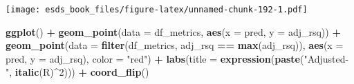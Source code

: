 \documentclass[
]{book}
\newenvironment{Shaded}{\begin{snugshade}}{\end{snugshade}}
\newcommand{\DataTypeTok}[1]{\textcolor[rgb]{0.13,0.29,0.53}{#1}}
\newcommand{\DecValTok}[1]{\textcolor[rgb]{0.00,0.00,0.81}{#1}}
\newcommand{\KeywordTok}[1]{\textcolor[rgb]{0.13,0.29,0.53}{\textbf{#1}}}
\newcommand{\NormalTok}[1]{#1}
\newcommand{\OperatorTok}[1]{\textcolor[rgb]{0.81,0.36,0.00}{\textbf{#1}}}
\newcommand{\StringTok}[1]{\textcolor[rgb]{0.31,0.60,0.02}{#1}}
\begin{document}
\begin{Shaded}
\end{Shaded}

\texttt{[image: esds\_book\_files/figure-latex/unnamed-chunk-192-1.pdf]}

\begin{Shaded}
\begin{Highlighting}[]
\KeywordTok{ggplot}\NormalTok{() }\OperatorTok{+}
\StringTok{  }\KeywordTok{geom_point}\NormalTok{(}\DataTypeTok{data =}\NormalTok{ df_metrics, }\KeywordTok{aes}\NormalTok{(}\DataTypeTok{x =}\NormalTok{ pred, }\DataTypeTok{y =}\NormalTok{ adj_rsq)) }\OperatorTok{+}
\StringTok{  }\KeywordTok{geom_point}\NormalTok{(}\DataTypeTok{data =} \KeywordTok{filter}\NormalTok{(df_metrics, adj_rsq }\OperatorTok{==}\StringTok{ }\KeywordTok{max}\NormalTok{(adj_rsq)), }\KeywordTok{aes}\NormalTok{(}\DataTypeTok{x =}\NormalTok{ pred, }\DataTypeTok{y =}\NormalTok{ adj_rsq), }\DataTypeTok{color =} \StringTok{"red"}\NormalTok{) }\OperatorTok{+}
\StringTok{  }\KeywordTok{labs}\NormalTok{(}\DataTypeTok{title =} \KeywordTok{expression}\NormalTok{(}\KeywordTok{paste}\NormalTok{(}\StringTok{"Adjusted-"}\NormalTok{, }\KeywordTok{italic}\NormalTok{(R)}\OperatorTok{^}\DecValTok{2}\NormalTok{))) }\OperatorTok{+}\StringTok{ }
\StringTok{  }\KeywordTok{coord_flip}\NormalTok{()}
\end{Highlighting}
\end{Shaded}
\end{document}
